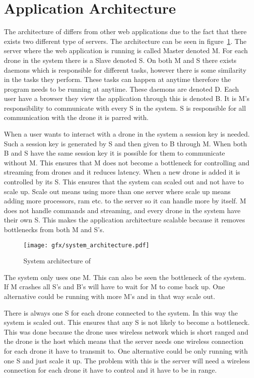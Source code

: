 \section{Application Architecture}

The architecture of \projectname{} differs from other web applications due to the fact that there exists two different type of servers. 
The architecture can be seen in figure~\ref{fig:system_architecture}.
The server where the web application is running is called Master denoted M.
For each drone in the system there is a Slave denoted S. 
On both M and S there exists daemons which is responsible for different tasks, however there is some similarity in the tasks they perform. These tasks can happen at anytime therefore the program needs to be running at anytime. These daemons are denoted D.
Each user have a browser they view the application through this is denoted B.
It is M's responsibility to communicate with every S in the system.
S is responsible for all communication with the drone it is parred with.

When a user wants to interact with a drone in the system a session key is needed. Such a session key is generated by S and then given to B through M. When both B and S have the same session key it is possible for them to communicate without M. This ensures that M does not become a bottleneck for controlling and streaming from drones and it reduces latency.
When a new drone is added it is controlled by its S. This ensures that the system can scaled out and not have to scale up. Scale out means using more than one server where scale up means adding more processors, ram etc. to the server so it can handle more by itself.
M does not handle commands and streaming, and every drone in the system have their own S. This makes the application architecture scalable because it removes bottlenecks from both M and S's.

\begin{figure}[htb]
    \centering 
    \texttt{[image: gfx/system\_architecture.pdf]}
    \caption{System architecture of \projectname{}}
    \label{fig:system_architecture}
\end{figure}

The system only uses one M. This can also be seen the bottleneck of the system. If M crashes all S's and B's will have to wait for M to come back up.
One alternative could be running with more M's and in that way scale out.

There is always one S for each drone connected to the system. In this way the system is scaled out. This ensures that any S is not likely to become a bottleneck.
This was done because the drone uses wireless network which is short ranged and the drone is the host which means that the server needs one wireless connection for each drone it have to transmit to.
One alternative could be only running with one S and just scale it up. The problem with this is the server will need a wireless connection for each drone it have to control and it have to be in range.

